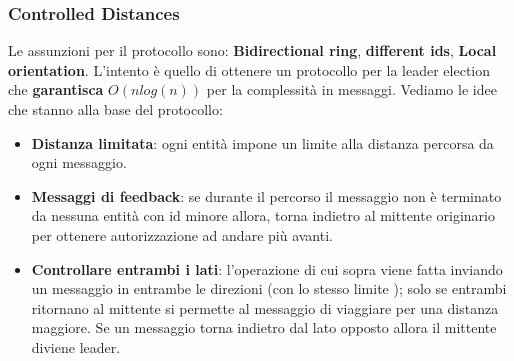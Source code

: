 \documentclass[12pt]{article}
\begin{document}
		\subsubsection{Controlled Distances}
			Le assunzioni per il protocollo sono: \textbf{Bidirectional ring}, \textbf{different ids}, \textbf{Local orientation}. L'intento è quello di ottenere un protocollo per la leader election che \textbf{garantisca} $O(nlog(n))$ per la complessità in messaggi. Vediamo le idee che stanno alla base del protocollo:
			\begin{itemize}
				\item \textbf{Distanza limitata}: ogni entità impone un limite alla distanza percorsa da ogni messaggio.
				\item \textbf{Messaggi di feedback}: se durante il percorso il messaggio non è terminato da nessuna entità con id minore allora, torna indietro al mittente originario per ottenere autorizzazione ad andare più avanti.
				\item \textbf{Controllare entrambi i lati}: l'operazione di cui sopra viene fatta inviando un messaggio in entrambe le direzioni (con lo stesso limite ); solo se entrambi ritornano al mittente si permette al messaggio di viaggiare per una distanza maggiore. Se un messaggio torna indietro dal lato opposto allora il mittente diviene leader.
			\end{itemize} 
		
\end{document}
